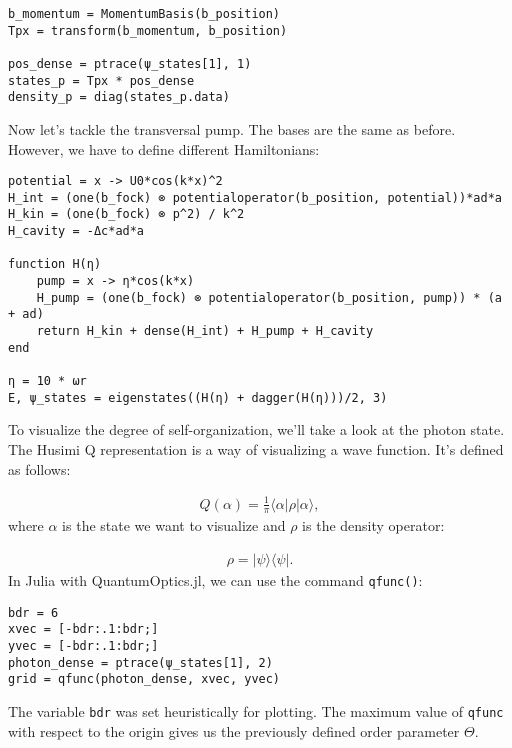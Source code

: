 \begin{lstlisting}
b_momentum = MomentumBasis(b_position)
Tpx = transform(b_momentum, b_position)

pos_dense = ptrace(ψ_states[1], 1)
states_p = Tpx * pos_dense
density_p = diag(states_p.data)
\end{lstlisting}Now let's tackle the transversal pump. The bases are the same as before. However, we have to define different Hamiltonians:

\begin{lstlisting}
potential = x -> U0*cos(k*x)^2
H_int = (one(b_fock) ⊗ potentialoperator(b_position, potential))*ad*a
H_kin = (one(b_fock) ⊗ p^2) / k^2
H_cavity = -Δc*ad*a

function H(η)
    pump = x -> η*cos(k*x)
    H_pump = (one(b_fock) ⊗ potentialoperator(b_position, pump)) * (a + ad)
    return H_kin + dense(H_int) + H_pump + H_cavity
end

η = 10 * ωr
E, ψ_states = eigenstates((H(η) + dagger(H(η)))/2, 3)
\end{lstlisting}To visualize the degree of self-organization, we'll take a look at the photon state. The Husimi Q representation is a way of visualizing a wave function. It's defined as follows:

\begin{align}
Q(\alpha) = \frac{1}{\pi} \langle \alpha | \rho | \alpha \rangle,
\end{align}where $\alpha$ is the state we want to visualize and $\rho$ is the density operator:

\begin{align}
\rho = |\psi \rangle \langle \psi |.
\end{align}In Julia with QuantumOptics.jl, we can use the command \texttt{qfunc()}:

\begin{lstlisting}
bdr = 6
xvec = [-bdr:.1:bdr;]
yvec = [-bdr:.1:bdr;]
photon_dense = ptrace(ψ_states[1], 2)
grid = qfunc(photon_dense, xvec, yvec)
\end{lstlisting}The variable \texttt{bdr} was set heuristically for plotting. The maximum value of \texttt{qfunc} with respect to the origin gives us the previously defined order parameter $\Theta$.
